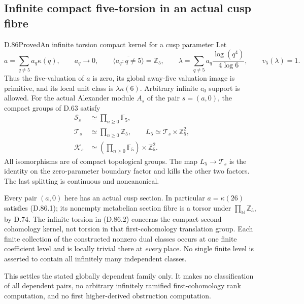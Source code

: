 \subsection{Infinite compact five-torsion in an actual cusp fibre}

\begin{statement}{D.86}{Proved}{An infinite torsion compact kernel for a cusp parameter}
Let
\[
 a=\sum_{q\ne5}a_q\kappa(q),\qquad a_q\longrightarrow0,
 \qquad \overline{\langle a_q:q\ne5\rangle}=\mathbb Z_5,
 \qquad
 \lambda=\sum_{q\ne5}a_q\frac{\log(q^4)}{4\log6},
 \qquad v_5(\lambda)=1.                                  \tag{D.86.1}
\]
Thus the five-valuation of \(a\) is zero, its global away-five
valuation image is primitive, and its local unit class is
\(\lambda\kappa(6)\). Arbitrary infinite \(c_0\) support is allowed.
For the actual Alexander module \(A_s\) of the pair \(s=(a,0)\),
the compact groups of D.63 satisfy
\[
 \begin{split}
 \mathcal S_s&\simeq\prod_{n\ge0}\mathbb F_5,\\
 \mathcal T_s&\simeq\prod_{n\ge0}\mathbb Z_5,\qquad
 L_5\simeq\mathcal T_s\times\mathbb Z_5^2,\\
 \mathcal K_s&\simeq
       \left(\prod_{n\ge0}\mathbb F_5\right)\times\mathbb Z_5^2.
 \end{split}                                             \tag{D.86.2}
\]
All isomorphisms are of compact topological groups. The map
\(L_5\to\mathcal T_s\) is the identity on the zero-parameter
boundary factor and kills the other two factors. The last
splitting is continuous and noncanonical.

Every pair \((a,0)\) here has an actual cusp section. In particular
\(a=\kappa(26)\) satisfies (D.86.1); its nonempty metabelian
section fibre is a torsor under
\(\prod_{\mathbb N}\mathbb Z_5\), by D.74. The infinite torsion
in (D.86.2) concerns the compact second-cohomology kernel, not
torsion in that first-cohomology translation group. Each finite
collection of the constructed nonzero dual classes occurs at
one finite coefficient level and is locally trivial there at
\emph{every} place. No single finite level is asserted to contain
all infinitely many independent classes.

This settles the stated globally dependent family only. It
makes no classification of all dependent pairs, no arbitrary
infinitely ramified first-cohomology rank computation, and no
first higher-derived obstruction computation.
\end{statement}


